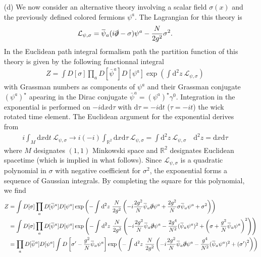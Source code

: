 \documentclass[10pt, a4paper]{article}
\begin{document}
\begin{enumerate}
  \item[(d)] We now consider an alternative theory involving a scalar field $\sigma(x)$ and the previously defined colored fermions $\psi^a$. The Lagrangian for this theory is
  \begin{align*}
    \mathcal{L}_{\psi, \sigma} = \bar{\psi}_a(i\slashed{\partial}-\sigma) \psi^a-\frac{N}{2 g^2} \sigma^2. 
  \end{align*} 
  In the Euclidean path integral formalism path the partition function of this theory is given by the following functionnal integral
  \begin{align*}
    Z = \int D[\sigma] \prod_{a} D[\bar{\psi}^a] D[\psi^a] \exp\left(\int \text{d}^2 z \ \mathcal{L}_{\psi, \sigma} \right)
  \end{align*} 
  with Grassman numbers as components of $\psi^a$ and their Grassman conjugate $(\psi^a)^\star$ apearing in the Dirac conjugate $\bar{\psi}^a = (\psi^a)^\star \gamma^0$. Integration in the exponential is performed on $-i\text{d}x \text{d}\tau$ with $\text{d}\tau = -i\text{d}t$ ($\tau = - i t$) the wick rotated time element. The Euclidean argument for the exponential derives from  
  \begin{align*}
    i \int_{M} \text{d} x \text{d} t  \ \mathcal{L}_{\psi, \sigma} \to  i(-i) \int_{\mathbb{R}^2} \text{d} x \text{d} \tau \ \mathcal{L}_{\psi, \sigma} = \int \text{d}^2 z \ \mathcal{L}_{\psi, \sigma} \quad \text{d}^2 z = \text{d} x \text{d} \tau
  \end{align*}
  where $M$ designates $(1, 1)$ Minkowski space and $\mathbb{R}^2$ designates Euclidean spacetime (which is implied in what follows). Since $\mathcal{L}_{\psi, \sigma}$ is a quadratic polynomial in $\sigma$ with negative coefficient for $\sigma^2$, the exponential forms a sequence of Gaussian integrals. By completing the square for this polynomial, we find 
  \begin{align*}
    Z &= \int D[\sigma] \prod_{a} D[\bar{\psi}^a] D[\psi^a] \exp\left(-\int \text{d}^2 z \ \frac{N}{2 g^2}\left(-i\frac{2 g^2}{N}\bar{\psi}_a\slashed{\partial}\psi^a+\frac{2 g^2}{N}\sigma \bar{\psi}_a \psi^a  + \sigma^2\right)\right)\\
    &=\int D[\sigma] \prod_{a} D[\bar{\psi}^a] D[\psi^a] \exp\left(-\int \text{d}^2 z \ \frac{N}{2 g^2}\left(-i\frac{2 g^2}{N}\bar{\psi}_a\slashed{\partial}\psi^a-\frac{2 g^4}{N^2} (\bar{\psi}_a \psi^a)^2  + \left(\sigma + \frac{g^2}{N} \bar{\psi}_a \psi^a\right)^2\right)\right)\\
    &= \prod_{a} D[\bar{\psi}^a] D[\psi^a] \int D\left[\sigma' - \frac{g^2}{N} \bar{\psi}_a \psi^a\right] \exp\left(-\int \text{d}^2 z \ \frac{N}{2 g^2}\left(-i\frac{2 g^2}{N}\bar{\psi}_a\slashed{\partial}\psi^a-\frac{g^4}{N^2} (\bar{\psi}_a \psi^a)^2  + \left(\sigma'\right)^2\right)\right)\\

\end{align*}
\end{enumerate}
\end{document}
